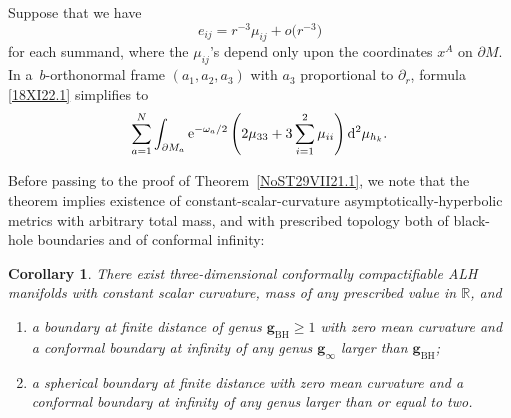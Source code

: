 \documentclass[pdftex]{sigma}
\numberwithin{equation}{section}
\newtheorem{Corollary}[Theorem]{Corollary}
\newcommand{\onframe}{\purple{a}}
\newcommand{\ominf}{\blue{\omega}}
\newcommand{\purple}[1]{{\color{purple}#1}}
\newcommand{\hk}{\red{h_{k}}}
\newcommand{\blue}[1]{{\color{blue}#1}}
\newcommand{\red}[1]{{\color{red}#1}}
\newcommand{\R}{\mathbb R}
\renewcommand{\red}[1]{#1}
\renewcommand{\blue}[1]{#1}
\renewcommand{\purple}[1]{#1}
\begin{document}
\begin{Remark} \label{R12VI22.1}
 Suppose that we have
 \begin{equation}\label{29VII21.3}
 e_{ij} = r^{-3} \mu_{ij} + o \big(r^{-3}\big)
 \end{equation}
 for each summand,
 where the $\mu_{ij}$'s depend only upon the coordinates $x^A$ on $\partial M$. {In a~$b$-or\-thonor\-mal frame $(\onframe_1,\onframe_2,\onframe_3)$ with $\onframe_3$ proportional to $\partial_r$, formula} \eqref{18XI22.1} simplifies to
 \begin{gather*}
 \sum_{a=1}^{N} \int_{ \partial M_a}{\rm e}^{-\ominf_a/2}
 \left(
 2 \mu_{33}
 + 3 \sum_{i=1}^{2}\mu_{ii}
 \right) {\rm d}^{2}\mu_{\hk}.
 \end{gather*}
\end{Remark}

{Before passing to the proof of Theorem~\ref{NoST29VII21.1}, we note that the theorem
 implies existence of constant-scalar-curvature asymptotically-hyperbolic metrics with arbitrary total mass, and with prescribed topology both of black-hole boundaries and of conformal infinity:}

\begin{Corollary}\label{NoSC21V22.1a}
There exist three-dimensional conformally compactifiable ALH manifolds with constant scalar curvature, mass of any {prescribed value in $\R$}, and
\begin{enumerate}\itemsep=0pt
 \item[$1)$] a boundary at finite distance of genus {${{\mathbf g}_{\mathrm{BH}}}\ge 1$}
 with zero mean curvature and a conformal boundary at infinity of any genus ${{\mathbf g}_\infty}$ larger than ${{\mathbf g}_{\mathrm{BH}}}$;
 \item[$2)$] a spherical boundary at finite distance with zero mean curvature and a conformal boundary at infinity of any genus larger than or equal to two.
\end{enumerate}
\end{Corollary}
\end{document}
